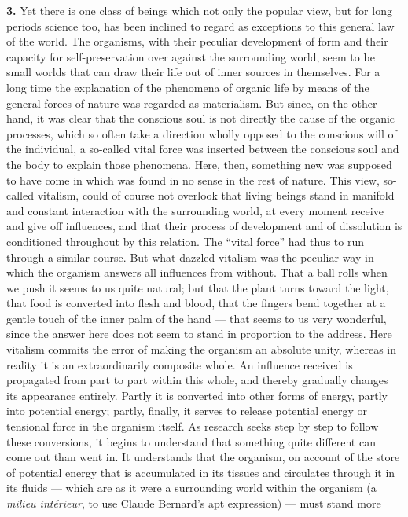 \documentclass[12pt,a4paper]{book}
\newcommand{\opage}[1]{\marginnote{\footnotesize\textit{[#1]}}}
\begin{document}
\textbf{3.} Yet there is one class of beings which not only the popular
view, but for long periods science too, has been inclined to regard as
exceptions to this general law of the world. The organisms, with their
peculiar development of form and their capacity for self-preservation
over against the surrounding world, seem to be small worlds that can
draw their life out of inner sources in themselves. For a long time the
explanation of the phenomena of organic life by means of the general
forces of nature was regarded as materialism. But since, on the other
hand, it was clear that the conscious soul is not directly the cause of
the organic processes, which so often take a direction wholly opposed to
the conscious will of the individual, a so-called vital force was
inserted between the conscious soul and the body to explain those
phenomena. Here, then, something new was supposed to have come in which
was found in no sense in the rest of nature. This view, so-called
vitalism, could of course not overlook that living beings stand in
manifold and constant interaction with the surrounding world, at every
moment receive and give off influences, and that their process of
development and of dissolution is conditioned throughout by this
relation. The
\opage{41}``vital force'' had thus to run through a similar course. But
what dazzled vitalism was the peculiar way in which the organism answers
all influences from without. That a ball rolls when we push it seems to
us quite natural; but that the plant turns toward the light, that food
is converted into flesh and blood, that the fingers bend together at a
gentle touch of the inner palm of the hand --- that seems to us very
wonderful, since the answer here does not seem to stand in proportion to
the address. Here vitalism commits the error of making the organism an
absolute unity, whereas in reality it is an extraordinarily composite
whole. An influence received is propagated from part to part within this
whole, and thereby gradually changes its appearance entirely. Partly it
is converted into other forms of energy, partly into potential energy;
partly, finally, it serves to release potential energy or tensional
force in the organism itself. As research seeks step by step to follow
these conversions, it begins to understand that something quite
different can come out than went in. It understands that the organism,
on account of the store of potential energy that is accumulated in its
tissues and circulates through it in its fluids --- which are as it
were a surrounding world within the organism (a \emph{milieu
intérieur}, to use Claude Bernard's apt expression) --- must stand more
\end{document}
